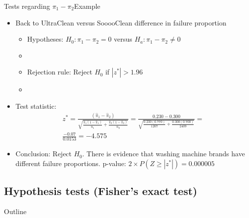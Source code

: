 \documentclass[xcolor=dvipsnames]{beamer}
\begin{document}
\begin{frame}{Tests regarding $\pi_1 - \pi_2$}{Example}
	\begin{itemize}
		\item Back to UltraClean versus SooooClean difference in failure proportion 
		\begin{itemize}
		\item Hypotheses: $H_0: \pi_1-\pi_2 = 0$ versus $H_a: \pi_1-\pi_2 \neq 0$  \pause
		\item[]
		\item Rejection rule: Reject $H_0$ if $|z^*| > 1.96$  \pause
		\item[]
		\end{itemize}

		\item Test statistic:  \pause
		\begin{gather*}
			z^*=\frac{(\hat{\pi}_1 - \hat{\pi}_2)}{\sqrt{\frac{\hat{\pi}_1 (1-\hat{\pi}_1)}{n_1}+\frac{\hat{\pi}_2 (1-\hat{\pi}_2)}{n_2}}} = \frac{0.230 - 0.300}{\sqrt{\frac{0.230 (0.770)}{1207}+\frac{0.300 (0.700)}{2409}}} =  \\
			\frac{-0.07}{0.0153} = -4.575
		\end{gather*} \pause
		\item Conclusion: Reject $H_0$. There is evidence that washing machine brands have different failure proportions. p-value: $2\times P(Z \geq |z^*|) =0.000005$ 
	\end{itemize}
\end{frame}

\subsection{Hypothesis tests (Fisher's exact test)}

\begin{frame}{Outline}
	\tableofcontents[currentsection,subsectionstyle=show/shaded/hide]
\end{frame}
\end{document}
